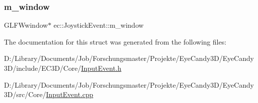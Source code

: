 \subsubsection{\texorpdfstring{m\+\_\+window}{m\_window}}
{\footnotesize\ttfamily G\+L\+F\+Wwindow$\ast$ ec\+::\+Joystick\+Event\+::m\+\_\+window}



The documentation for this struct was generated from the following files\+:\begin{DoxyCompactItemize}
\item 
D\+:/\+Library/\+Documents/\+Job/\+Forschungsmaster/\+Projekte/\+Eye\+Candy3\+D/\+Eye\+Candy3\+D/include/\+E\+C3\+D/\+Core/\mbox{\hyperlink{_input_event_8h}{Input\+Event.\+h}}\item 
D\+:/\+Library/\+Documents/\+Job/\+Forschungsmaster/\+Projekte/\+Eye\+Candy3\+D/\+Eye\+Candy3\+D/src/\+Core/\mbox{\hyperlink{_input_event_8cpp}{Input\+Event.\+cpp}}\end{DoxyCompactItemize}
